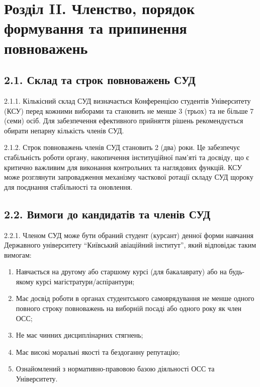 \section*{Розділ II. Членство, порядок формування та припинення повноважень}

\subsection*{2.1. Склад та строк повноважень СУД}
    2.1.1. Кількісний склад СУД визначається Конференцією студентів Університету (КСУ) перед кожними виборами та становить не менше 3 (трьох) та не більше 7 (семи) осіб. Для забезпечення ефективного прийняття рішень рекомендується обирати непарну кількість членів СУД.

    2.1.2. Строк повноважень членів СУД становить 2 (два) роки. Це забезпечує стабільність роботи органу, накопичення інституційної пам'яті та досвіду, що є критично важливим для виконання контрольних та наглядових функцій. КСУ може розглянути запровадження механізму часткової ротації складу СУД щороку для поєднання стабільності та оновлення.

\subsection*{2.2. Вимоги до кандидатів та членів СУД}
    2.2.1. Членом СУД може бути обраний студент (курсант) денної форми навчання Державного університету ``Київський авіаційний інститут'', який відповідає таким вимогам:
        \begin{enumerate}[label=\alph*)]
            \item Навчається на другому або старшому курсі (для бакалаврату) або на будь-якому курсі магістратури/аспірантури;
            \item Має досвід роботи в органах студентського самоврядування не менше одного повного строку повноважень на виборній посаді або одного року як член ОСС;
            \item Не має чинних дисциплінарних стягнень;
            \item Має високі моральні якості та бездоганну репутацію;
            \item Ознайомлений з нормативно-правовою базою діяльності ОСС та Університету.
        \end{enumerate}

